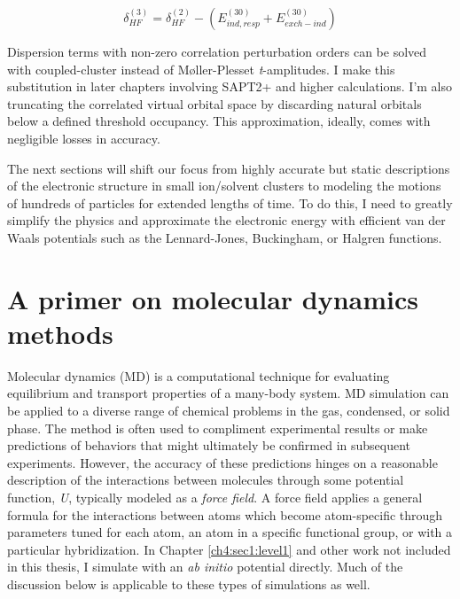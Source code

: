 \begin{theory}
  \begin{equation}\label{deltahf3}
      \delta_{HF}^{(3)} = \delta_{HF}^{(2)} - \left(E_{ind,resp}^{(30)} + E_{exch-ind}^{(30)}\right)
  \end{equation}
  
  Dispersion terms with non-zero correlation perturbation orders can be solved with coupled-cluster
  instead of M$\text{\o}$ller-Plesset \emph{t}-amplitudes. I make this substitution in later chapters involving
  SAPT2+ and higher calculations. I'm also truncating the correlated virtual orbital space by discarding
  natural orbitals below a defined threshold occupancy. This approximation, ideally, comes with negligible
  losses in accuracy. 
  
  The next sections will shift our focus from highly accurate but static descriptions of the electronic 
  structure in small ion/solvent clusters to modeling the motions of hundreds of particles for extended 
  lengths of time. To do this, I need to greatly simplify the physics and approximate the electronic energy 
  with efficient van der Waals potentials such as the Lennard-Jones, Buckingham, or Halgren functions.
  
 \section{\label{ch2:sec3:level1}A primer on molecular dynamics methods}
 Molecular dynamics (MD) is a computational technique for evaluating equilibrium and transport properties 
 of a many-body system\cite{smit}. MD simulation can be applied to a diverse range of chemical problems
 in the gas, condensed, or solid phase. The method is often used to compliment experimental results or 
 make predictions of behaviors that might ultimately be confirmed in subsequent experiments. However, the
 accuracy of these predictions hinges on a reasonable description of the interactions between molecules
 through some potential function, \emph{U}, typically modeled as a \emph{force field}. A force field applies
 a general formula for the interactions between atoms which become atom-specific through parameters tuned 
 for each atom, an atom in a specific functional group, or with a particular hybridization. In Chapter 
 \ref{ch4:sec1:level1} and other work not included in this thesis, I simulate with an \emph{ab initio} 
 potential directly. Much of the discussion below is applicable to these types of simulations as well.
 

\end{theory}
